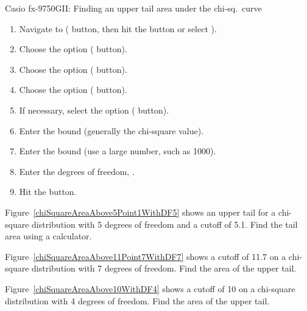 \begin{onebox}{ Casio fx-9750GII: Finding an upper tail area under the chi-sq.~curve}
\begin{enumerate}
\setlength{\itemsep}{0mm}
\item Navigate to  ( button, then hit the  button or select ).
\item Choose the  option ( button).
\item Choose the  option ( button).
\item Choose the  option ( button).
\item If necessary, select the  option ( button).
\item Enter the  bound (generally the chi-square value).
\item Enter the  bound (use a large number, such as 1000).
\item Enter the degrees of freedom, .
\item Hit the  button.
\end{enumerate}
\end{onebox}

\begin{exercisewrap}
\begin{nexercise}
Figure~\ref{chiSquareAreaAbove5Point1WithDF5} shows an upper tail for a chi-square distribution with 5 degrees of freedom and a cutoff of 5.1. Find the tail area using a calculator.\footnotemark\end{nexercise}
\end{exercisewrap}

\begin{exercisewrap}
\begin{nexercise}
Figure~\ref{chiSquareAreaAbove11Point7WithDF7} shows a cutoff of 11.7 on a chi-square distribution with 7 degrees of freedom. Find the area of the upper tail.\footnotemark
\end{nexercise}
\end{exercisewrap}


\begin{exercisewrap}
\begin{nexercise}
Figure~\ref{chiSquareAreaAbove10WithDF4} shows a cutoff of 10 on a chi-square distribution with 4 degrees of freedom. Find the area of the upper tail.\footnotemark
\end{nexercise}
\end{exercisewrap}

